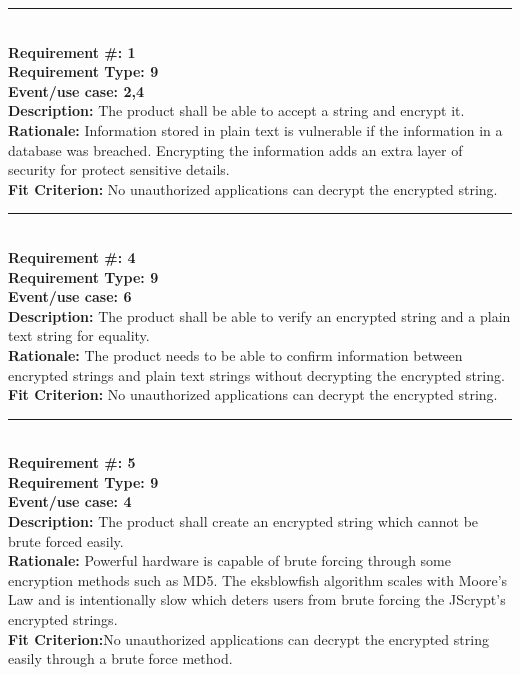 \documentclass[12pt]{article}
\begin{document}
	\noindent\rule{12cm}{0.4pt} \\ 

	\noindent\textbf{Requirement \#: 1}\\
	\textbf{Requirement Type: 9	}\\
	\textbf{Event/use case: 2,4}\\
	\textbf{Description:} The product shall be able to accept a string and encrypt it.\\
	\textbf{Rationale:} Information stored in plain text is vulnerable if the information in a database was breached. Encrypting the information adds an extra layer of security for protect sensitive details.\\
	\textbf{Fit Criterion:} No unauthorized applications can decrypt the encrypted string.

	\noindent\rule{12cm}{0.4pt} \\

	\noindent\textbf{Requirement \#: 4}\\
	\textbf{Requirement Type: 9	}\\
	\textbf{Event/use case: 6}\\
	\textbf{Description:} The product shall be able to verify an encrypted string and a plain text string for equality.\\
	\textbf{Rationale:} The product needs to be able to confirm information between encrypted strings and plain text strings without decrypting the encrypted string.\\
	\textbf{Fit Criterion:} No unauthorized applications can decrypt the encrypted string.\\

	\noindent\rule{12cm}{0.4pt} \\

	\noindent\textbf{Requirement \#: 5}\\
	\textbf{Requirement Type: 9	}\\
	\textbf{Event/use case: 4}\\
	\textbf{Description:} The product shall create an encrypted string which cannot be brute forced easily.\\
	\textbf{Rationale:}  Powerful hardware is capable of brute forcing through some encryption methods such as MD5. The eksblowfish algorithm scales with Moore’s Law and is intentionally slow which deters users from brute forcing the JScrypt’s encrypted strings.\\
	\textbf{Fit Criterion:}No unauthorized applications can decrypt the encrypted string easily through a brute force method.\\
\end{document}
